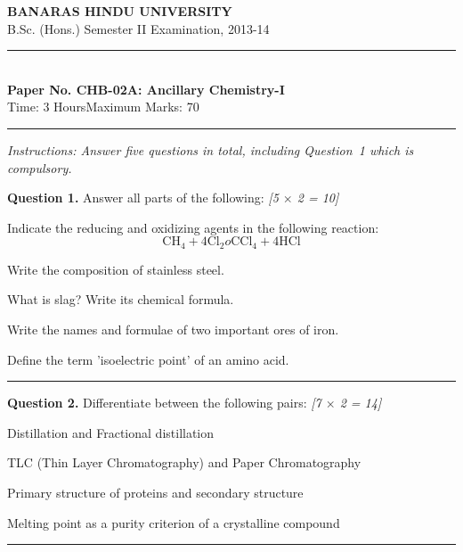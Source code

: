 \documentclass[11pt,a4paper]{article}
\newcommand{\pts}[1]{\hfill   \textit{[#1]}}
\begin{document}
\begin{center}
  {\large\bfseries BANARAS HINDU UNIVERSITY}\\[2pt]
  {\normalsize B.Sc. (Hons.) Semester II Examination, 2013-14}\\[6pt]
  \rule{0.8\linewidth}{0.5pt}\\[6pt]
  {\large\bfseries Paper No. CHB-02A: Ancillary Chemistry-I}\\[4pt]
  {\normalsize Time: 3 Hours\hfill Maximum Marks: 70}
\end{center}
\rule{\linewidth}{0.4pt}
\small



\noindent   \textit{Instructions: Answer five questions in total, including Question~1 which is compulsory.}

\normalsize
\bigskip




\noindent   \textbf{Question 1.} Answer all parts of the following: \pts{5 $ \times$ 2 = 10}

\begin{parts}
  \item Indicate the reducing and oxidizing agents in the following reaction:
    \[  \text{CH}_4 + 4 \text{Cl}_2  o  \text{CCl}_4 + 4 \text{HCl} \]
  \item Write the composition of stainless steel.
  \item What is slag? Write its chemical formula.
  \item Write the names and formulae of two important ores of iron.
  \item Define the term 'isoelectric point' of an amino acid.
\end{parts}

\medskip\rule{\linewidth}{0.2pt}




\noindent   \textbf{Question 2.} Differentiate between the following pairs: \pts{7 $ \times$ 2 = 14}

\begin{parts}
  \item Distillation and Fractional distillation
  \item TLC (Thin Layer Chromatography) and Paper Chromatography
  \item Primary structure of proteins and secondary structure
  \item Melting point as a purity criterion of a crystalline compound
\end{parts}

\medskip\rule{\linewidth}{0.2pt}
\end{document}
